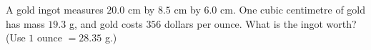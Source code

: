 A gold ingot measures $20.0$ cm by $8.5$ cm by $6.0$ cm. One cubic centimetre of gold has mass $19.3$ g, and gold costs $356$ dollars per ounce. What is the ingot worth? (Use $1$ ounce $=28.35$ g.)
